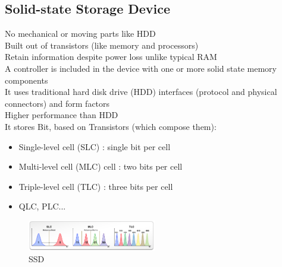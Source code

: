 \documentclass[10pt, oneside]{article}
\begin{document}
\subsection{Solid-state Storage Device}
No mechanical or moving parts like HDD\\
Built out of transistors (like memory and processors)\\
Retain information despite power loss unlike typical RAM\\
A controller is included in the device with one or more solid state memory components\\
It uses traditional hard disk drive (HDD) interfaces (protocol and physical connectors) and form factors\\
Higher performance than HDD\\
It stores Bit, based on Transistors (which compose them):
\begin{multicols}{2}
\begin{itemize}
    \item Single-level cell (SLC) : single bit per cell 
    \item Multi-level cell (MLC) cell : two bits per cell
    \item Triple-level cell (TLC) : three bits per cell
    \item QLC, PLC...
\end{itemize}
\columnbreak
\noindent
\begin{figure}[H]
    \begin{center}
    \includegraphics[width=0.5\textwidth]{img/img14.png}
    \caption{SSD}
    \label{fig:SSDs}
    \end{center}
\end{figure}
\end{multicols}
\end{document}
